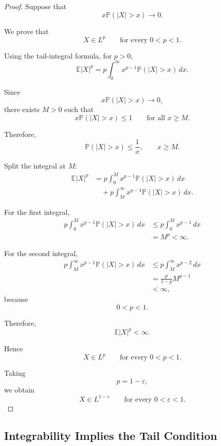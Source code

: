 \begin{proof}

Suppose that
\[
x\mathbb{P}(|X|>x)
\longrightarrow0.
\]

We prove that
\[
X\in L^p
\qquad
\text{for every }0<p<1.
\]

Using the tail-integral formula, for $p>0$,
\[
\mathbb{E}|X|^p
=
p\int_0^\infty
x^{p-1}
\mathbb{P}(|X|>x)\,dx.
\]

Since
\[
x\mathbb{P}(|X|>x)
\longrightarrow0,
\]
there exists $M>0$ such that
\[
x\mathbb{P}(|X|>x)\leq1
\qquad
\text{for all }x\geq M.
\]

Therefore,
\[
\mathbb{P}(|X|>x)
\leq
\frac1x,
\qquad
x\geq M.
\]

Split the integral at $M$:
\[
\begin{aligned}
\mathbb{E}|X|^p
&=
p\int_0^M
x^{p-1}
\mathbb{P}(|X|>x)\,dx\\
&\quad+
p\int_M^\infty
x^{p-1}
\mathbb{P}(|X|>x)\,dx.
\end{aligned}
\]

For the first integral,
\[
\begin{aligned}
p\int_0^M
x^{p-1}
\mathbb{P}(|X|>x)\,dx
&\leq
p\int_0^M x^{p-1}\,dx\\
&=
M^p
<
\infty.
\end{aligned}
\]

For the second integral,
\[
\begin{aligned}
p\int_M^\infty
x^{p-1}
\mathbb{P}(|X|>x)\,dx
&\leq
p\int_M^\infty x^{p-2}\,dx\\
&=
\frac{p}{1-p}M^{p-1}\\
&<\infty,
\end{aligned}
\]
because
\[
0<p<1.
\]

Therefore,
\[
\mathbb{E}|X|^p<\infty.
\]

Hence
\[
X\in L^p
\qquad
\text{for every }0<p<1.
\]

Taking
\[
p=1-\varepsilon,
\]
we obtain
\[
\boxed{
X\in L^{1-\varepsilon}
\qquad
\text{for every }0<\varepsilon<1.
}
\]

\end{proof}



\subsection{Integrability Implies the Tail Condition}

